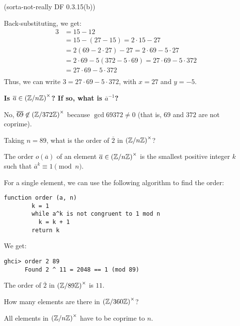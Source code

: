 \begin{problem}{\textsf{(sorta-not-really DF 0.3.15(b))}}
\begin{enumalph}
\begin{Answer}
    \noindent
    Back-substituting, we get:
    \begin{align*}
      3 &= 15 - 12 \\
        &= 15 - (27 - 15) = 2 \cdot 15 - 27 \\
        &= 2 (69 - 2 \cdot 27) - 27 = 2 \cdot 69 - 5 \cdot 27 \\
        &= 2 \cdot 69 - 5 (372 - 5 \cdot 69) = 27 \cdot 69 - 5 \cdot 372 \\
        &= 27 \cdot 69 - 5 \cdot 372 \\ 
    \end{align*}
    Thus, we can write $3 = 27 \cdot 69 - 5 \cdot 372$, with $x = 27$ and $y = -5$.

    \bigskip\noindent
    \textbf{Is $\overline{a} \in {(\mathbb{Z}/n\mathbb{Z})}^\times$?  If so, what is $\overline{a}^{-1}$?}
    
    \noindent
    No, $\overline{69} \not\in {(\mathbb{Z}/372\mathbb{Z})}^\times$ because $\gcd{69}{372} \neq 0$
    (that is, $69$ and $372$ are not coprime). 
  \end{Answer}
  \newpage
  \item Taking $n = 89$, what is the order of $\overline{2}$ in ${(\mathbb{Z}/n\mathbb{Z})}^\times$?
  \begin{Answer}
    The order $o(\overline{a})$ of an element $\overline{a} \in {(\mathbb{Z}/n\mathbb{Z})}^\times$
    is the smallest positive integer $k$ such that $\overline{a}^k \equiv 1 \pmod{n}$.

    \noindent
    For a single element, we can use the following algorithm to find the order:

    \bigskip
    \begin{Verbatim}[fontsize=\footnotesize, frame=single, framesep=2mm, commandchars=\\\{\}]
      function order (a, n)
        k = 1
        while a^k is not congruent to 1 mod n
          k = k + 1
        return k
    \end{Verbatim}
    \noindent
    We get:
    \begin{Verbatim}[fontsize=\footnotesize, frame=single]
      ghci> order 2 89
      Found 2 ^ 11 = 2048 == 1 (mod 89)
    \end{Verbatim}

    \bigskip
    \noindent
    The order of $\overline{2}$ in ${(\mathbb{Z}/89\mathbb{Z})}^\times$ is $11$.
  \end{Answer}
  \item How many elements are there in ${(\mathbb{Z}/360\mathbb{Z})}^\times$?
  \begin{Answer}
    All elements in ${(\mathbb{Z}/n\mathbb{Z})}^\times$ have to be coprime to $n$.


\end{Answer}
\end{enumalph}
\end{problem}
